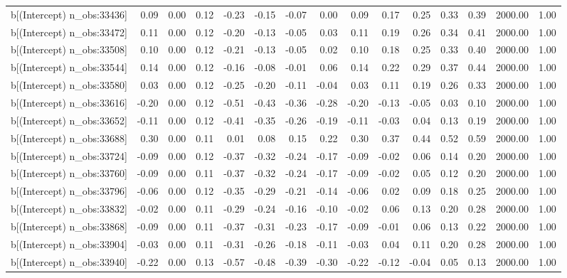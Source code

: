 \begin{table}[ht]
\begin{tabular}{rrrrrrrrrrrrrrr}
  b[(Intercept) n\_obs:33436] & 0.09 & 0.00 & 0.12 & -0.23 & -0.15 & -0.07 & 0.00 & 0.09 & 0.17 & 0.25 & 0.33 & 0.39 & 2000.00 & 1.00 \\ 
  b[(Intercept) n\_obs:33472] & 0.11 & 0.00 & 0.12 & -0.20 & -0.13 & -0.05 & 0.03 & 0.11 & 0.19 & 0.26 & 0.34 & 0.41 & 2000.00 & 1.00 \\ 
  b[(Intercept) n\_obs:33508] & 0.10 & 0.00 & 0.12 & -0.21 & -0.13 & -0.05 & 0.02 & 0.10 & 0.18 & 0.25 & 0.33 & 0.40 & 2000.00 & 1.00 \\ 
  b[(Intercept) n\_obs:33544] & 0.14 & 0.00 & 0.12 & -0.16 & -0.08 & -0.01 & 0.06 & 0.14 & 0.22 & 0.29 & 0.37 & 0.44 & 2000.00 & 1.00 \\ 
  b[(Intercept) n\_obs:33580] & 0.03 & 0.00 & 0.12 & -0.25 & -0.20 & -0.11 & -0.04 & 0.03 & 0.11 & 0.19 & 0.26 & 0.33 & 2000.00 & 1.00 \\ 
  b[(Intercept) n\_obs:33616] & -0.20 & 0.00 & 0.12 & -0.51 & -0.43 & -0.36 & -0.28 & -0.20 & -0.13 & -0.05 & 0.03 & 0.10 & 2000.00 & 1.00 \\ 
  b[(Intercept) n\_obs:33652] & -0.11 & 0.00 & 0.12 & -0.41 & -0.35 & -0.26 & -0.19 & -0.11 & -0.03 & 0.04 & 0.13 & 0.19 & 2000.00 & 1.00 \\ 
  b[(Intercept) n\_obs:33688] & 0.30 & 0.00 & 0.11 & 0.01 & 0.08 & 0.15 & 0.22 & 0.30 & 0.37 & 0.44 & 0.52 & 0.59 & 2000.00 & 1.00 \\ 
  b[(Intercept) n\_obs:33724] & -0.09 & 0.00 & 0.12 & -0.37 & -0.32 & -0.24 & -0.17 & -0.09 & -0.02 & 0.06 & 0.14 & 0.20 & 2000.00 & 1.00 \\ 
  b[(Intercept) n\_obs:33760] & -0.09 & 0.00 & 0.11 & -0.37 & -0.32 & -0.24 & -0.17 & -0.09 & -0.02 & 0.05 & 0.12 & 0.20 & 2000.00 & 1.00 \\ 
  b[(Intercept) n\_obs:33796] & -0.06 & 0.00 & 0.12 & -0.35 & -0.29 & -0.21 & -0.14 & -0.06 & 0.02 & 0.09 & 0.18 & 0.25 & 2000.00 & 1.00 \\ 
  b[(Intercept) n\_obs:33832] & -0.02 & 0.00 & 0.11 & -0.29 & -0.24 & -0.16 & -0.10 & -0.02 & 0.06 & 0.13 & 0.20 & 0.28 & 2000.00 & 1.00 \\ 
  b[(Intercept) n\_obs:33868] & -0.09 & 0.00 & 0.11 & -0.37 & -0.31 & -0.23 & -0.17 & -0.09 & -0.01 & 0.06 & 0.13 & 0.22 & 2000.00 & 1.00 \\ 
  b[(Intercept) n\_obs:33904] & -0.03 & 0.00 & 0.11 & -0.31 & -0.26 & -0.18 & -0.11 & -0.03 & 0.04 & 0.11 & 0.20 & 0.28 & 2000.00 & 1.00 \\ 
  b[(Intercept) n\_obs:33940] & -0.22 & 0.00 & 0.13 & -0.57 & -0.48 & -0.39 & -0.30 & -0.22 & -0.12 & -0.04 & 0.05 & 0.13 & 2000.00 & 1.00 \\ 

\end{tabular}
\end{table}
